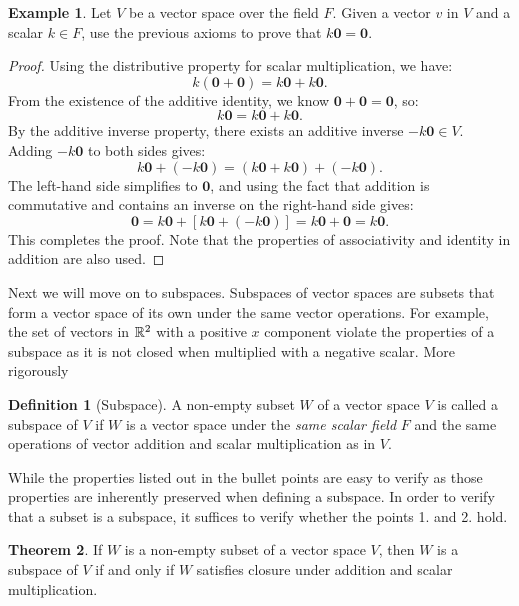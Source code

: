 \documentclass[12pt]{article}
\theoremstyle{definition}
\newtheorem{theorem}{Theorem}[section]
\newtheorem{definition}[theorem]{Definition}
\newtheorem*{example}{Example}
\begin{document}
\begin{example}
    Let $V$ be a vector space over the field $F$. Given a vector $v$ in $V$ and a scalar $k \in F$, use the previous axioms to prove that $k\mathbf{0}=\mathbf{0}$.
\end{example}

\begin{proof}
    Using the distributive property for scalar multiplication, we have:
    \[
    k(\mathbf{0}+\mathbf{0})=k\mathbf{0}+k\mathbf{0}.
    \]
    From the existence of the additive identity, we know $\mathbf{0}+\mathbf{0}=\mathbf{0}$, so:
    \[
    k\mathbf{0}=k\mathbf{0}+k\mathbf{0}.
    \]
    By the additive inverse property, there exists an additive inverse $-k\mathbf{0}\in V$. Adding $-k\mathbf{0}$ to both
    sides gives:
    \[
    k\mathbf{0}+(-k\mathbf{0})=(k\mathbf{0}+k\mathbf{0})+(-k\mathbf{0}).
    \]
    The left-hand side simplifies to $\mathbf{0}$, and using the fact that addition is commutative and contains an inverse on the right-hand side gives:
    \[
    \mathbf{0} = k\mathbf{0}+[k\mathbf{0}+(-k\mathbf{0})] = k\mathbf{0}+\mathbf{0} = k\mathbf{0}.
    \]
    This completes the proof. Note that the properties of associativity and identity in addition are also used.
\end{proof}

Next we will move on to subspaces. Subspaces of vector spaces are subsets that form a vector space of its own under the same vector operations. For example, the set of vectors in $\mathbb{R}^2$ with a positive $x$ component violate the properties of a subspace as it is not closed when multiplied with a negative scalar. More rigorously

\begin{definition}[Subspace]
    A non-empty subset $W$ of a vector space $V$ is called a subspace of $V$ if $W$ is a vector space under the \emph{same scalar field} $F$ and the same operations of vector addition and scalar multiplication as in $V$. 
\end{definition}

While the properties listed out in the bullet points are easy to verify as those properties are inherently preserved when defining a subspace. In order to verify that a subset is a subspace, it suffices to verify whether the points 1. and 2. hold.  

\begin{theorem}
    If $W$ is a non-empty subset of a vector space $V$, then $W$ is a subspace of $V$ if and only if $W$ satisfies closure under addition and scalar multiplication.
\end{theorem}
\end{document}
